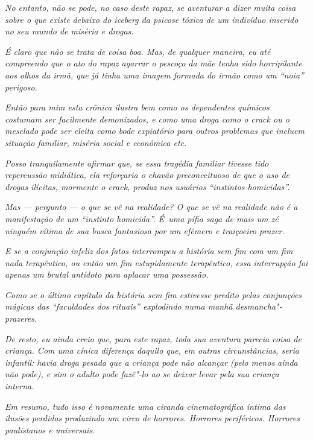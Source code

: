 \emph{No entanto, não se pode, no caso deste rapaz, se aventurar a dizer
muita coisa sobre o que existe debaixo do iceberg da psicose tóxica de
um indivíduo inserido no seu mundo de miséria e drogas.}~

\emph{É claro que não se trata de coisa boa. Mas, de qualquer maneira,
eu até compreendo que o ato do rapaz agarrar o pescoço da mãe tenha sido
horripilante aos olhos da irmã, que já tinha uma imagem formada do irmão
como um ``noia'' perigoso.}~

\emph{Então para mim esta crônica ilustra bem como os dependentes
químicos costumam ser facilmente demonizados, e como uma droga como o
crack ou o mesclado pode ser eleita como bode expiatório para outros
problemas que incluem situação familiar, miséria social e econômica
etc.}~

\emph{Posso tranquilamente afirmar que, se essa tragédia familiar
tivesse tido repercussão midiática, ela reforçaria o chavão
preconceituoso de que o uso de drogas ilícitas, mormente o crack, produz
nos usuários ``instintos homicidas''.}~

\emph{Mas --- pergunto --- o que se vê na realidade? O que se vê na
realidade não é a manifestação de um ``instinto homicida''. É~uma pífia
saga de mais um zé ninguém vítima de sua busca fantasiosa por um efêmero
e traiçoeiro prazer.}~

\emph{E se a conjunção infeliz dos fatos interrompeu a história sem fim
com um fim nada terapêutico, ou então um fim estupidamente terapêutico,
essa interrupção foi apenas um brutal antídoto para aplacar uma
possessão.}~

\emph{Como se o último capítulo da história sem fim estivesse predito
pelas conjunções mágicas das ``faculdades dos rituais'' explodindo numa
manhã desmancha"-prazeres.}~

\emph{De resto, eu ainda creio que, para este rapaz, toda sua aventura
parecia coisa de criança. Com uma cínica diferença daquilo que, em
outras circunstâncias, seria infantil: havia droga pesada que a criança
pode não alcançar (pelo menos ainda não pode), e sim o adulto pode
fazê"-lo ao se deixar levar pela sua criança interna.}~

\emph{Em resumo, tudo isso é novamente uma ciranda cinematográfica
íntima das ilusões perdidas produzindo um circo de horrores. Horrores
periféricos. Horrores paulistanos e universais.~}
